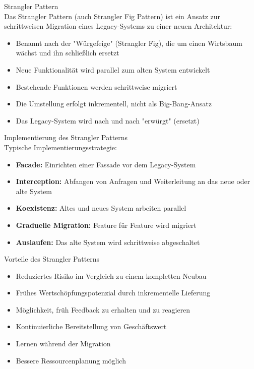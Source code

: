 \begin{definition}{Strangler Pattern}\\
    Das Strangler Pattern (auch Strangler Fig Pattern) ist ein Ansatz zur schrittweisen Migration eines Legacy-Systems zu einer neuen Architektur:
    \begin{itemize}
        \item Benannt nach der "Würgefeige" (Strangler Fig), die um einen Wirtsbaum wächst und ihn schließlich ersetzt
        \item Neue Funktionalität wird parallel zum alten System entwickelt
        \item Bestehende Funktionen werden schrittweise migriert
        \item Die Umstellung erfolgt inkrementell, nicht als Big-Bang-Ansatz
        \item Das Legacy-System wird nach und nach "erwürgt" (ersetzt)
    \end{itemize}
\end{definition}

\begin{concept}{Implementierung des Strangler Patterns}\\
    Typische Implementierungsstrategie:
    \begin{itemize}
        \item \textbf{Facade:} Einrichten einer Fassade vor dem Legacy-System
        \item \textbf{Interception:} Abfangen von Anfragen und Weiterleitung an das neue oder alte System
        \item \textbf{Koexistenz:} Altes und neues System arbeiten parallel
        \item \textbf{Graduelle Migration:} Feature für Feature wird migriert
        \item \textbf{Auslaufen:} Das alte System wird schrittweise abgeschaltet
    \end{itemize}
\end{concept}

\begin{concept}{Vorteile des Strangler Patterns}\\
    \begin{itemize}
        \item Reduziertes Risiko im Vergleich zu einem kompletten Neubau
        \item Frühes Wertschöpfungspotenzial durch inkrementelle Lieferung
        \item Möglichkeit, früh Feedback zu erhalten und zu reagieren
        \item Kontinuierliche Bereitstellung von Geschäftswert
        \item Lernen während der Migration
        \item Bessere Ressourcenplanung möglich
    \end{itemize}
\end{concept}

